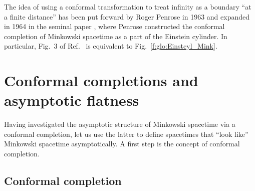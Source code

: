 \begin{hist}
The idea of using a conformal transformation to treat infinity as a boundary
``at a finite distance'' has been put forward by Roger Penrose
in 1963 \cite{Penro63} and expanded in 1964 in the seminal paper \cite{Penro64},
where Penrose constructed the
conformal completion of Minkowski spacetime as a part of the Einstein cylinder.
In particular, Fig.~3 of Ref.~\cite{Penro64} is equivalent to Fig.~\ref{f:glo:Einstcyl_Mink}.
\end{hist}



\section{Conformal completions and asymptotic flatness} \label{s:glo:conf_compl}

Having investigated the asymptotic structure of Minkowski spacetime
via a conformal completion, let us use the latter to define spacetimes
that ``look like'' Minkowski spacetime asymptotically.
A first step is the concept of conformal completion.

\subsection{Conformal completion} \label{s:glo:def_conf_compl}

